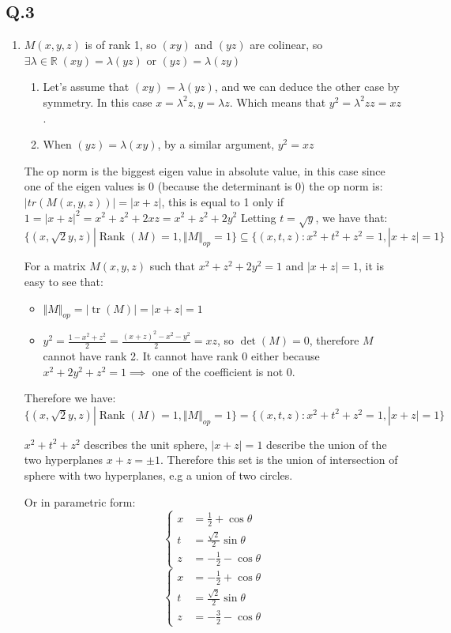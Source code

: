 \documentclass[12pt]{article}\usepackage[]{graphicx}\usepackage[]{color}
\newcommand{\Q}[1]{\subsection*{Q.#1}}
\newenvironment{question}[1]
{\Q{#1}}{}
\DeclareMathOperator{\tr}{tr}
\DeclareMathOperator{\rank}{Rank}
\begin{document}
\begin{question}{3}
\begin{enumerate}
    \begin{enumerate}
    \item
      $M(x,y,z)$ is of rank 1, so $(x y)$ and $(y z)$ are colinear, so  $ \exists \lambda  \in \mathbb{R} \; (x y) = \lambda (y z)  \text{ or } (y z) = \lambda (z y)$
      \begin{enumerate}
      \item Let's assume that $(x y) = \lambda (y z)$, and we can
        deduce the other case by symmetry.  In this case
        $x = \lambda^2 z, y = \lambda z$. Which means that $y^2 = \lambda^2z z = xz$.
      \item When $(y z) = \lambda (x y)$, by a similar argument, $y^2 = xz$
      \end{enumerate}
      The op norm is the biggest eigen value in absolute value, in this case since one of the
      eigen values is 0 (because the determinant is 0) the op norm is:
      $|tr(M(x, y, z))| = |x + z|$, this is equal to 1 only if $1 = |x+z|^2 = x^2 + z^2 + 2xz = x^2 + z^2 + 2y^2$
      Letting $t = \sqrt y$, we have that:
      $\{ (x, \sqrt2 y, z) | \rank(M) = 1, \Vert M\Vert _{op} = 1 \} \subseteq \{ (x, t, z): x^2 + t^2 + z^2 = 1, |x+z|=1  \} $


      
      For a matrix $M(x, y, z)$ such that $x^2 + z^2 + 2y^2 = 1$ and $|x+z|=1$, it is easy to see that:
      \begin{itemize}
      \item $\Vert M\Vert _{op} = |\tr(M)| = |x+z| = 1$
      \item $y^2 = \frac{1 - x^2 + z^2}2 = \frac{(x+z)^2 - x^2 - y^2}2 = xz$, so $\det(M) = 0$, therefore $M$ cannot have rank 2. It cannot have rank 0 either because $x^2 + 2y^2 + z^2 = 1 \implies$ one of the coefficient is not 0.
      \end{itemize}
      Therefore we have:
      $\{ (x, \sqrt2 y, z) | \rank(M) = 1, \Vert M\Vert _{op} = 1 \} = \{ (x, t, z): x^2 + t^2 + z^2 = 1, |x+z|=1  \} $
      
      $x^2 + t^2 + z^2$ describes the unit sphere, $|x+z| = 1$ describe the union of the two hyperplanes $x + z = \pm 1$.
      Therefore this set is the union of  intersection of sphere with two hyperplanes, e.g a union of two circles.

      Or in parametric form:
      \[
        \left\{
          \begin{array}{cc}
            x &=  \frac12 + \cos \theta \\
            t &= \frac{\sqrt2}2 \sin \theta \\
            z &= - \frac12 - \cos \theta
          \end{array}
        \right.
      \]
      \[
        \left\{
          \begin{array}{cc}
            x &=  -\frac12 + \cos \theta \\
            t &= \frac{\sqrt2}2 \sin \theta \\
            z &=  -\frac32 - \cos \theta
          \end{array}
        \right.
      \]     


\end{enumerate}
\end{enumerate}
\end{question}
\end{document}
